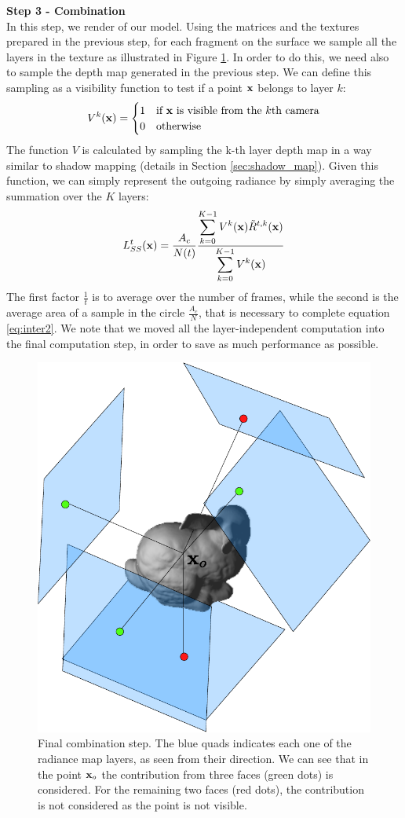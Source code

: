 \textbf{Step 3 - Combination} \\
In this step, we render of our model. Using the matrices and the textures prepared in the previous step, for each fragment on the surface we sample all the layers in the texture as illustrated in Figure \ref{fig:step3}. In order to do this, we need also to sample the depth map generated in the previous step. We can define this sampling as a visibility function to test if a point $\mathbf{x}$ belongs to layer $k$:
$$
V^k(\mathbf{x}) = \begin{cases}
1 & \text{if $\mathbf{x}$ is visible from the $k$th camera} \\
0 & \text{otherwise}
\end{cases}
$$
The function $V$ is calculated by sampling the k-th layer depth map in a way similar to shadow mapping (details in Section \ref{sec:shadow_map}). Given this function, we can simply represent the outgoing radiance by simply averaging the summation over the $K$ layers:
$$
L_{SS}^t(\mathbf{x}) = \frac{A_c}{N (t)} \frac{\displaystyle\sum_{k = 0}^{K-1}V^k(\mathbf{x}) \tilde{R}^{t,k}(\mathbf{x})}{\displaystyle\sum_{k = 0}^{K-1}V^k(\mathbf{x})}
$$
The first factor $\frac{1}{t}$ is to average over the number of frames, while the second is the average area of a sample in the circle $\frac{A_c}{N}$, that is necessary to complete equation \ref{eq:inter2}. We note that we moved all the layer-independent computation into the final computation step, in order to save as much performance as possible. 

\begin{figure}[!ht]
\centering
\includegraphics[width=0.6 \linewidth]{images/method/combination.pdf}
\caption{Final combination step. The blue quads indicates each one of the radiance map layers, as seen from their direction. We can see that in the point $\mathbf{x}_o$ the contribution from three faces (green dots) is considered. For the remaining two faces (red dots), the contribution is not considered as the point is not visible.}
\label{fig:step3}
\end{figure} 

